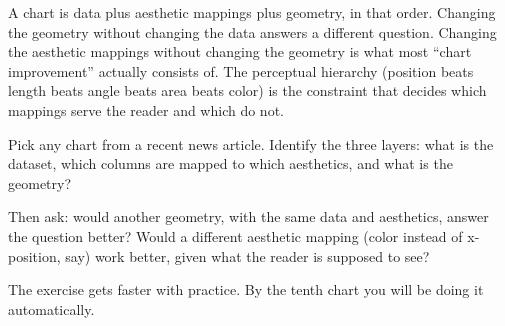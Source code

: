 \documentclass[
  letterpaper,
  11pt,
  twoside,
  openany]{scrbook}
\begin{document}
\begin{tcolorbox}[enhanced jigsaw, arc=.35mm, bottomrule=.15mm, bottomtitle=1mm, breakable, colback=white, colbacktitle=quarto-callout-warning-color!10!white, colframe=quarto-callout-warning-color-frame, coltitle=black, left=2mm, leftrule=.75mm, opacityback=0, opacitybacktitle=0.6, rightrule=.15mm, title=\textcolor{quarto-callout-warning-color}{\faExclamationTriangle}\hspace{0.5em}{Key insight}, titlerule=0mm, toprule=.15mm, toptitle=1mm]

A chart is data plus aesthetic mappings plus geometry, in that order.
Changing the geometry without changing the data answers a different
question. Changing the aesthetic mappings without changing the geometry
is what most ``chart improvement'' actually consists of. The perceptual
hierarchy (position beats length beats angle beats area beats color) is
the constraint that decides which mappings serve the reader and which do
not.

\end{tcolorbox}

\begin{tcolorbox}[enhanced jigsaw, arc=.35mm, bottomrule=.15mm, bottomtitle=1mm, breakable, colback=white, colbacktitle=quarto-callout-tip-color!10!white, colframe=quarto-callout-tip-color-frame, coltitle=black, left=2mm, leftrule=.75mm, opacityback=0, opacitybacktitle=0.6, rightrule=.15mm, title=\textcolor{quarto-callout-tip-color}{\faLightbulb}\hspace{0.5em}{Try this}, titlerule=0mm, toprule=.15mm, toptitle=1mm]

Pick any chart from a recent news article. Identify the three layers:
what is the dataset, which columns are mapped to which aesthetics, and
what is the geometry?

Then ask: would another geometry, with the same data and aesthetics,
answer the question better? Would a different aesthetic mapping (color
instead of x-position, say) work better, given what the reader is
supposed to see?

The exercise gets faster with practice. By the tenth chart you will be
doing it automatically.

\end{tcolorbox}
\end{document}
